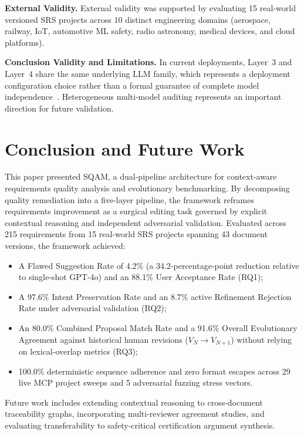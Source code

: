 \documentclass[journal]{IEEEtran}
\begin{document}
\textbf{External Validity.} External validity was supported by evaluating 15 real-world versioned SRS projects across 10 distinct engineering domains (aerospace, railway, IoT, automotive ML safety, radio astronomy, medical devices, and cloud platforms).

\textbf{Conclusion Validity and Limitations.} In current deployments, Layer~3 and Layer~4 share the same underlying LLM family, which represents a deployment configuration choice rather than a formal guarantee of complete model independence~\cite{zheng2023judging}. Heterogeneous multi-model auditing represents an important direction for future validation.

\section{Conclusion and Future Work}
\label{sec:conclusion}

This paper presented SQAM, a dual-pipeline architecture for context-aware requirements quality analysis and evolutionary benchmarking. By decomposing quality remediation into a five-layer pipeline, the framework reframes requirements improvement as a surgical editing task governed by explicit contextual reasoning and independent adversarial validation. Evaluated across 215 requirements from 15 real-world SRS projects spanning 43 document versions, the framework achieved:
\begin{itemize}
    \item A Flawed Suggestion Rate of 4.2\% (a 34.2-percentage-point reduction relative to single-shot GPT-4o) and an 88.1\% User Acceptance Rate (RQ1);
    \item A 97.6\% Intent Preservation Rate and an 8.7\% active Refinement Rejection Rate under adversarial validation (RQ2);
    \item An 80.0\% Combined Proposal Match Rate and a 91.6\% Overall Evolutionary Agreement against historical human revisions ($V_N \to V_{N+1}$) without relying on lexical-overlap metrics (RQ3);
    \item 100.0\% deterministic sequence adherence and zero format escapes across 29 live MCP project sweeps and 5 adversarial fuzzing stress vectors.
\end{itemize}

Future work includes extending contextual reasoning to cross-document traceability graphs, incorporating multi-reviewer agreement studies, and evaluating transferability to safety-critical certification argument synthesis.



\end{document}
